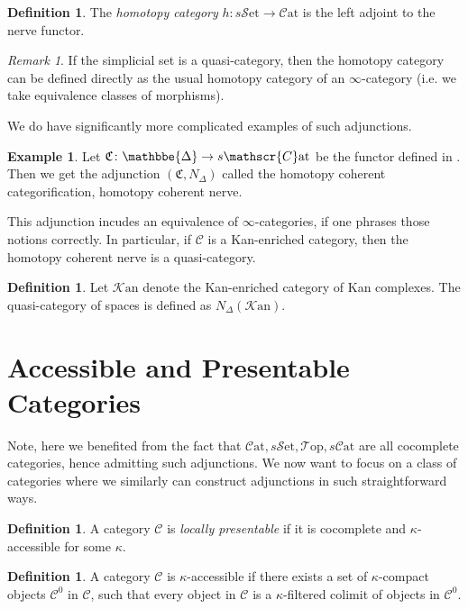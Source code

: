 \documentclass[10pt]{amsart}
\newcommand{\C}{\mathscr{C}}
\newcommand{\kC}{\mathfrak{C}}
\newcommand{\cat}{\mathscr{C}\mathrm{at}}
\newcommand{\scat}{s\mathscr{C}\mathrm{at}}
\newcommand{\sset}{s\mathscr{S}\mathrm{et}}
\newcommand{\Top}{\mathscr{T}\mathrm{op}}
\newcommand{\Kan}{\mathscr{K}\mathrm{an}}
\def\DDelta{{\mathbbe{\Delta}}}
\newcommand{\DD}{\DDelta}
\theoremstyle{definition}
\newtheorem{definition}[equation]{Definition}
\newtheorem{example}[equation]{Example}
\theoremstyle{remark}
\newtheorem{remark}[equation]{Remark}
\begin{document}
\begin{definition}
  The \emph{homotopy category} $h\colon \sset \to \cat$ is the left adjoint to the nerve functor.
\end{definition}

\begin{remark}
 If the simplicial set is a quasi-category, then the homotopy category can be defined directly as the usual homotopy category of an $\infty$-category (i.e. we take equivalence classes of morphisms).
\end{remark}

We do have significantly more complicated examples of such adjunctions.

\begin{example}
  Let $\kC\colon \DD \to \scat$ be the functor defined in \cite[Definition 1.1.5.1]{lurie2009htt}. Then we get the adjunction $(\kC,N_\Delta)$ called the homotopy coherent categorification, homotopy coherent nerve.
\end{example}

  This adjunction incudes an equivalence of $\infty$-categories, if one phrases those notions correctly. In particular, if $\C$ is a Kan-enriched category, then the homotopy coherent nerve is a quasi-category.

\begin{definition}
  Let $\Kan$ denote the Kan-enriched category of Kan complexes. The quasi-category of spaces is defined as $N_\Delta (\Kan)$.
\end{definition}

\section{Accessible and Presentable Categories}
Note, here we benefited from the fact that $\cat,\sset,\Top,\scat$ are all cocomplete categories, hence admitting such adjunctions. We now want to focus on a class of categories where we similarly can construct adjunctions in such straightforward ways.

\begin{definition}
  A category $\C$ is \emph{locally presentable} if it is cocomplete and $\kappa$-accessible for some $\kappa$.
\end{definition}

\begin{definition}
  A category $\C$ is $\kappa$-accessible if there exists a set of $\kappa$-compact objects $\C^0$ in $\C$, such that every object in $\C$ is a $\kappa$-filtered colimit of objects in $\C^0$.
\end{definition}
\end{document}
